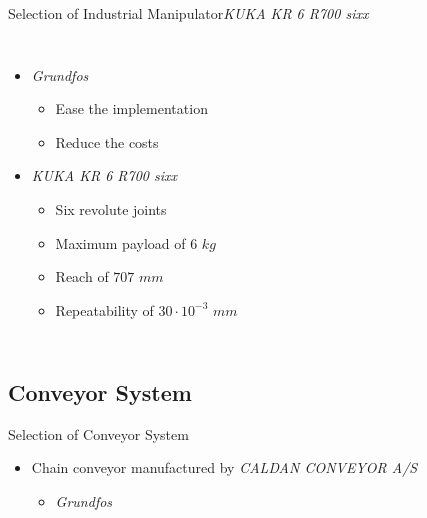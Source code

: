 \begin{frame}{Selection of Industrial Manipulator}{\textit{KUKA KR 6 R700 sixx}}
\begin{columns}
    \begin{itemize}
        \item \textit{Grundfos}
            \begin{itemize}
                \item Ease the implementation
                \item Reduce the costs
            \end{itemize}
    \vspace{2.5mm}
        \item \textit{KUKA KR 6 R700 sixx}
            \begin{itemize}
                \item Six revolute joints
                \item Maximum payload of $6$ $kg$
                \item Reach of $707$ $mm$
                \item Repeatability of $30\cdot10^{-3}$ $mm$
            \end{itemize}
    \end{itemize}
\end{columns}
\end{frame}

\subsection{Conveyor System}
\begin{frame}{Selection of Conveyor System}
    \begin{itemize}
        \item Chain conveyor manufactured by \textit{CALDAN CONVEYOR A/S}
            \begin{itemize}
                \item \textit{Grundfos}
            \end{itemize}
    \end{itemize}
\vspace{5mm}
\end{frame}


